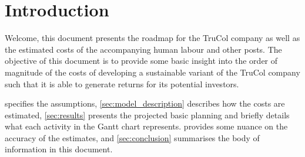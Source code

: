 \section{Introduction}\label{sec:intro}
Welcome, this document presents the roadmap for the TruCol company as well as the estimated costs of the accompanying human labour and other posts. The objective of this document is to provide some basic insight into the order of magnitude of the costs of developing a sustainable variant of the TruCol company such that it is able to generate returns for its potential investors.

 specifies the assumptions, \cref{sec:model_description} describes how the costs are estimated, \cref{sec:results} presents the projected basic planning and briefly details what each activity in the Gantt chart represents.  provides some nuance on the accuracy of the estimates, and \cref{sec:conclusion} summarises the body of information in this document.